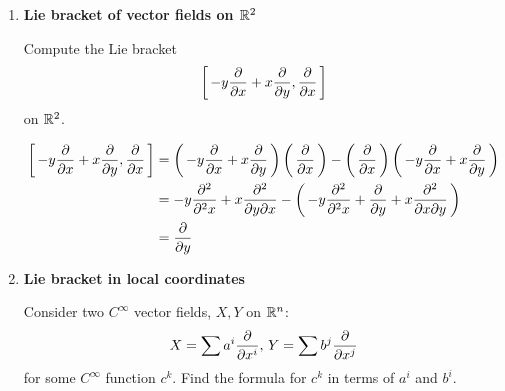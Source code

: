\documentclass[12pt,a4paper]{report}
\newcommand{\BLUE}[1]{\textcolor{blue}{#1}}
\begin{document}
\begin{enumerate}[label=14.\arabic*]
	\BLUE{Remember that the Lie Bracket on vector fields is
	\begin{align*}
		[X,Y] &= XY-YX 
	\end{align*}So,
	\begin{align*}
		[fX,gY] &= (fX)(gY) - (gY)(fX) \\
		&= T_1 - T_2 
	\end{align*}We must keep in mind that these are operators executed on some function $h$.  Thus,
	\begin{align*}
		T_1(h) &= (fX)(gY)(h)\\
		&= f\cdot\PAREN{(Xg)Y(h)+g(XY)(h)} \\
		&= f(Xg)Y(h)+fg(XY)(h)
	\end{align*}similarly
	\begin{align*}
		T_2(h) &= (gY)(fX)(h) \\
		&= g\cdot\PAREN{(Yf)X(h)+f(YX)(h)} \\
		&= g(Yf)X(h)+gf(YX)(h)
	\end{align*}then
	\begin{align*}
		T_1 - T_2 &= f(Xg)Y(h)+fg(XY)(h) - (g(Yf)X(h)+gf(YX)(h)) \\
		&= fg[X,Y](h) + f(Xg)Y(h) - g(Yf)X(h)
	\end{align*}
	}
	
	\item \textbf{Lie bracket of vector fields on $\mathbb{R}^2$}
	
	Compute the Lie bracket
	\begin{align*}
		\left [\, -y\frac{\partial }{\partial x}+x\frac{\partial }{\partial y}, \frac{\partial }{\partial x} \,\right ]
	\end{align*}on $\mathbb{R}^2$.
	
	\BLUE{
	\begin{align*}
		\left [\, -y\frac{\partial }{\partial x}+x\frac{\partial }{\partial y}, \frac{\partial }{\partial x} \,\right ] &= \left (\, -y\frac{\partial }{\partial x}+x\frac{\partial }{\partial y} \,\right )\left (\, \frac{\partial }{\partial x} \,\right )-\left (\, \frac{\partial }{\partial x} \,\right )\left (\, -y\frac{\partial }{\partial x}+x\frac{\partial }{\partial y} \,\right ) \\
		&= -y\frac{\partial^2}{\partial^2 x} + x\frac{\partial ^2}{\partial y\partial x} - \left (\, -y\frac{\partial^2}{\partial^2 x} + \frac{\partial }{\partial y}+x\frac{\partial^2}{\partial x\partial y} \,\right ) \\
		&= \frac{\partial }{\partial y}
	\end{align*}
	}
	
	\item \textbf{Lie bracket in local coordinates}
	
	Consider two $C^\infty$ vector fields, $X, Y$ on $\mathbb{R}^n$:
	\begin{align*}
		X = \sum a^i\frac{\partial }{\partial x^i}, \, Y=\sum b^j\frac{\partial }{\partial x^j}
	\end{align*}for some $C^\infty$ function $c^k$.  Find the formula for $c^k$ in terms of $a^i$ and $b^i$.
	

\end{enumerate}
\end{document}
